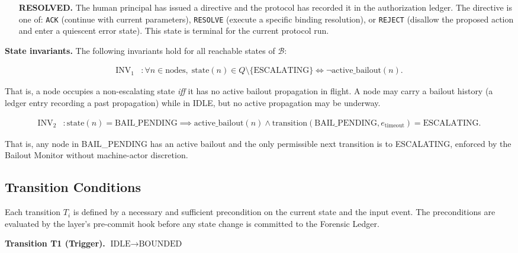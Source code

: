 \begin{itemize}
\item[\textbf{RESOLVED.}] The human principal has issued a directive and the protocol has recorded it in the authorization ledger. The directive is one of: \texttt{ACK} (continue with current parameters), \texttt{RESOLVE} (execute a specific binding resolution), or \texttt{REJECT} (disallow the proposed action and enter a quiescent error state). This state is terminal for the current protocol run.
\end{itemize}

\bigskip
\noindent\textbf{State invariants.} The following invariants hold for all reachable states of $\mathcal{B}$:

\begin{align}
\text{INV}_1 &: \forall n \in \text{nodes},\; \text{state}(n) \in Q \setminus \{\text{ESCALATING}\} \iff \neg\text{active\_bailout}(n). \tag{INV-1}
\end{align}

That is, a node occupies a non-escalating state \emph{iff} it has no active bailout propagation in flight. A node may carry a bailout history (a ledger entry recording a past propagation) while in IDLE, but no active propagation may be underway.

\begin{align}
\text{INV}_2 &: \text{state}(n) = \text{BAIL\_PENDING} \implies \text{active\_bailout}(n) \land \text{transition}(\text{BAIL\_PENDING}, e_{\text{timeout}}) = \text{ESCALATING}. \tag{INV-2}
\end{align}

That is, any node in BAIL\_PENDING has an active bailout and the only permissible next transition is to ESCALATING, enforced by the Bailout Monitor without machine-actor discretion.

\subsection{Transition Conditions}\label{sec:transitions}

Each transition $T_i$ is defined by a necessary and sufficient precondition on the current state and the input event. The preconditions are evaluated by the \fact{} layer's pre-commit hook before any state change is committed to the Forensic Ledger.

\bigskip
\noindent\textbf{Transition T1 (Trigger).} $\text{IDLE} \rightarrow \text{BOUNDED}$

